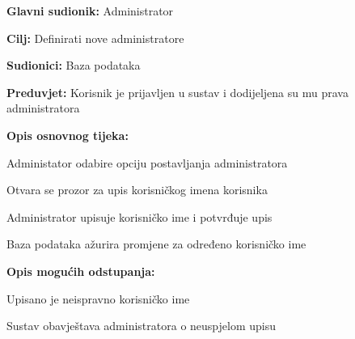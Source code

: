 					\noindent {}
					\begin{packed_item}
	
						\item \textbf{Glavni sudionik: }Administrator
						\item  \textbf{Cilj:} Definirati nove administratore
						\item  \textbf{Sudionici:} Baza podataka
						\item  \textbf{Preduvjet:} Korisnik je prijavljen u sustav i dodijeljena su mu prava administratora
						\item  \textbf{Opis osnovnog tijeka:}
						
						\item[] \begin{packed_enum}
	
							\item Administator odabire opciju postavljanja administratora
							\item Otvara se prozor za upis korisničkog imena korisnika
							\item Administrator upisuje korisničko ime i potvrđuje upis
							\item Baza podataka ažurira promjene za određeno korisničko ime
						\end{packed_enum}

						\item  \textbf{Opis mogućih odstupanja:}
						
						\item[] \begin{packed_item}
	
							\item[3.a] Upisano je neispravno korisničko ime
							\item[] \begin{packed_enum}
								
								\item Sustav obavještava administratora o neuspjelom upisu
								
							\end{packed_enum}
						\end{packed_item}
						
					\end{packed_item}

